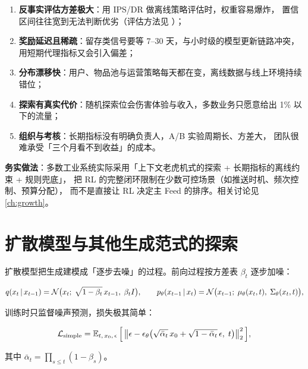 \begin{pitfall}[离线 RL 在推荐中落地困难的五个真实原因]
\begin{enumerate}
  \item \textbf{反事实评估方差极大}：用 IPS/DR 做离线策略评估时，权重容易爆炸，
        置信区间往往宽到无法判断优劣（评估方法见 \cite{dudik2011ee,saito2020doubly}）；
  \item \textbf{奖励延迟且稀疏}：留存类信号要等 7--30 天，与小时级的模型更新链路冲突，
        用短期代理指标又会引入偏差；
  \item \textbf{分布漂移快}：用户、物品池与运营策略每天都在变，离线数据与线上环境持续错位；
  \item \textbf{探索有真实代价}：随机探索位会伤害体验与收入，多数业务只愿意给出 1\% 以下的流量；
  \item \textbf{组织与考核}：长期指标没有明确负责人，A/B 实验周期长、方差大，
        团队很难承受「三个月看不到收益」的成本。
\end{enumerate}
\textbf{务实做法}：多数工业系统实际采用「上下文老虎机式的探索 + 长期指标的离线约束 + 规则兜底」，
把 RL 的完整闭环限制在少数可控场景（如推送时机、频次控制、预算分配），
而不是直接让 RL 决定主 Feed 的排序。相关讨论见 \cref{ch:growth}。
\end{pitfall}

\section{扩散模型与其他生成范式的探索}

扩散模型把生成建模成「逐步去噪」的过程。前向过程按方差表 $\beta_t$ 逐步加噪：

\begin{equation}
q(x_t \,\vert\, x_{t-1}) = \mathcal{N}\big( x_t;\; \sqrt{1 - \beta_t}\, x_{t-1},\; \beta_t I \big),
\qquad
p_\theta(x_{t-1} \,\vert\, x_t) = \mathcal{N}\big( x_{t-1};\; \mu_\theta(x_t, t),\; \Sigma_\theta(x_t, t) \big),
\label{eq:diffusion}
\end{equation}

训练时只监督噪声预测，损失极其简单：

\begin{equation}
\mathcal{L}_{\text{simple}}
= \operatorname{\mathbb{E}}_{t,\, x_0,\, \epsilon}\Big[
\left\lVert  \epsilon - \epsilon_\theta\big( \sqrt{\bar{\alpha}_t}\, x_0 + \sqrt{1 - \bar{\alpha}_t}\, \epsilon,\; t \big)  \right\rVert_2^2 \Big],
\label{eq:diffusion-loss}
\end{equation}

其中 $\bar{\alpha}_t = \prod_{s \le t} (1 - \beta_s)$。

